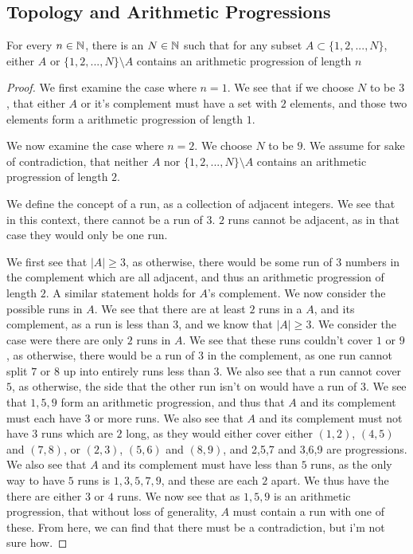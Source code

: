 \subsection{Topology and Arithmetic Progressions}




\begin{majorEx}
  For every $n \in \mathbb{N}$, there is an $N \in \mathbb{N}$ such that for any
  subset $A \subset \{1,2,...,N\}$, either $A$ or $\{1,2,...,N\}
  \setminus A$ contains an arithmetic progression of length $n$
\end{majorEx}

\begin{proof}
  We first examine the case where $n=1$. We see that if we choose $N$
  to be $3$, that either $A$ or it's complement must have a set with
  $2$ elements, and those two elements form a arithmetic progression
  of length $1$.

  We now examine the case where $n=2$. We choose $N$ to
  be $9$. We assume for sake of contradiction, that neither $A$ nor 
  $\{1,2,...,N\} \setminus A$ contains an arithmetic progression 
  of length $2$. 

  We define the concept of a run, as a collection of adjacent
  integers. We see that in this context, there cannot be a run of
  $3$. $2$ runs cannot be adjacent, as in that case they would only be
  one run.

  We first see that $|A|\geq 3$, as otherwise, there
  would be some run of $3$ numbers in the complement which 
  are all adjacent, and thus an
  arithmetic progression of length $2$. A similar statement holds for
  $A$'s complement. We now consider the possible
  runs in $A$. We see that there are at least $2$ runs in a $A$, and
  its complement, as a run is less than $3$, and we know that $|A|\geq
  3$. We consider the case were there are only $2$ runs in $A$. 
  We see that these runs couldn't cover $1$ or $9$, as otherwise,
  there would be a run of $3$ in the complement, as one run cannot
  split $7$ or $8$ up into entirely runs less than $3$. We also see
  that a run cannot cover $5$, as otherwise, the side that the other
  run isn't on would have a run of $3$. We see that $1,5,9$ form an
  arithmetic progression, and thus that $A$ and its complement must
  each have $3$ or more runs. We also see that $A$ and its complement
  must not have $3$ runs which are $2$ long, as they would either
  cover either $(1,2)$, $(4,5)$ and $(7,8)$, or $(2,3)$, $(5,6)$ and
  $(8,9)$, and 2,5,7 and 3,6,9 are progressions. We also see that $A$
  and its complement must have less than $5$ runs, as the only way to
  have $5$ runs is $1,3,5,7,9$, and these are each $2$ apart. We thus
  have the there are either $3$ or $4$ runs. We now see that as
  $1,5,9$ is an arithmetic progression, that without loss of
  generality, $A$ must contain a run with one of these. From here, we
  can find that there must be a contradiction, but i'm not sure how.
\end{proof}

